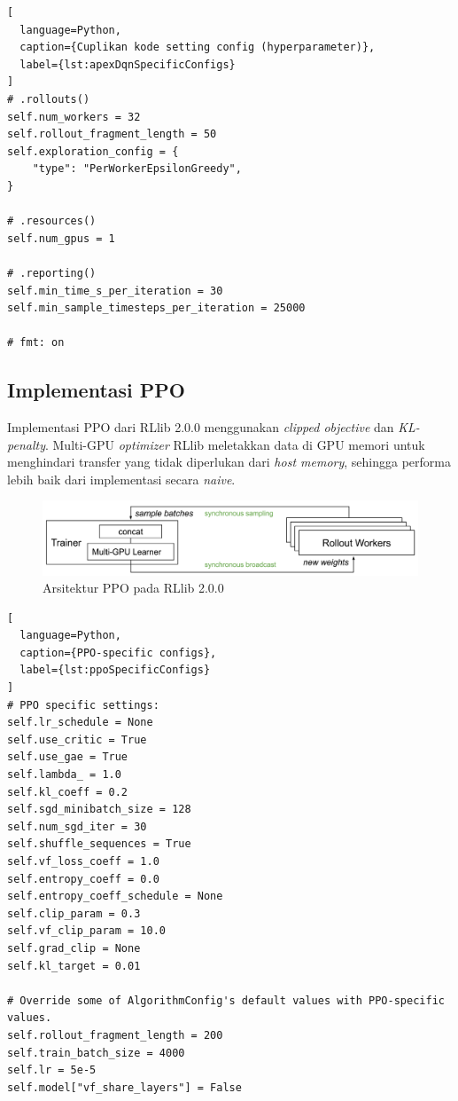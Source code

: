 \begin{lstlisting}[
  language=Python,
  caption={Cuplikan kode setting config (hyperparameter)},
  label={lst:apexDqnSpecificConfigs}
]
# .rollouts()
self.num_workers = 32
self.rollout_fragment_length = 50
self.exploration_config = {
    "type": "PerWorkerEpsilonGreedy",
}

# .resources()
self.num_gpus = 1

# .reporting()
self.min_time_s_per_iteration = 30
self.min_sample_timesteps_per_iteration = 25000

# fmt: on
\end{lstlisting}

\subsection{Implementasi PPO}
Implementasi PPO dari RLlib 2.0.0 menggunakan \emph{clipped objective} dan \emph{KL-penalty}.
Multi-GPU \emph{optimizer} RLlib meletakkan data di GPU memori untuk menghindari transfer yang tidak diperlukan
dari \emph{host memory}, sehingga performa lebih baik dari implementasi secara \emph{naive}.

\begin{figure}[H]
  \centering
    \includegraphics[scale=0.6]{gambar/rllib_ppo_architecture.png}
    \caption{Arsitektur PPO pada RLlib 2.0.0 \citep{rllibDocumentation}}
    \label{fig:rllib_ppo_architecture}
\end{figure}

\begin{lstlisting}[
  language=Python,
  caption={PPO-specific configs},
  label={lst:ppoSpecificConfigs}
]
# PPO specific settings:
self.lr_schedule = None
self.use_critic = True
self.use_gae = True
self.lambda_ = 1.0
self.kl_coeff = 0.2
self.sgd_minibatch_size = 128
self.num_sgd_iter = 30
self.shuffle_sequences = True
self.vf_loss_coeff = 1.0
self.entropy_coeff = 0.0
self.entropy_coeff_schedule = None
self.clip_param = 0.3
self.vf_clip_param = 10.0
self.grad_clip = None
self.kl_target = 0.01

# Override some of AlgorithmConfig's default values with PPO-specific values.
self.rollout_fragment_length = 200
self.train_batch_size = 4000
self.lr = 5e-5
self.model["vf_share_layers"] = False
    
\end{lstlisting}

